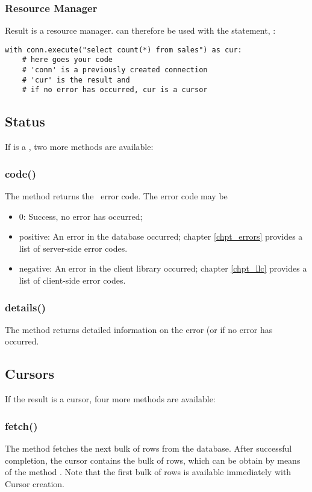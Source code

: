 \subsubsection{Resource Manager}
Result is a resource manager.
 can therefore
be used with the  statement, \eg:

\begin{python}
\begin{lstlisting}
with conn.execute("select count(*) from sales") as cur:
    # here goes your code
    # 'conn' is a previously created connection
    # 'cur' is the result and
    # if no error has occurred, cur is a cursor
\end{lstlisting}
\end{python}

\subsection{Status}
If  is a ,
two more methods are available:

\subsubsection{code()}
The method returns the \nowdb\ error code.
The error code may be
\begin{itemize}
\item 0: Success, no error has occurred;
\item positive:
An error in the database occurred;
chapter \ref{chpt_errors} provides a list
of server-side error codes.
\item negative:
An error in the client library occurred;
chapter \ref{chpt_llc} provides a list
of client-side error codes.
\end{itemize}

\subsubsection{details()}
The method returns
detailed information on the error
(or  if no error has occurred.

\subsection{Cursors}
If the result is a cursor,
four more methods are available:

\subsubsection{fetch()}
The method fetches the next bulk
of rows from the database.
After successful completion,
the cursor contains the bulk
of rows, which can be obtain by means of
the method .
Note that the first bulk of rows
is available immediately with
Cursor creation.

